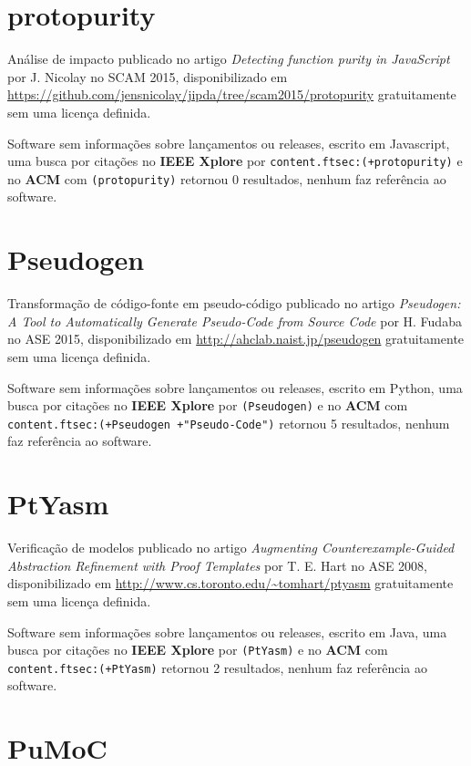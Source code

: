 \section{protopurity}

Análise de impacto
publicado no artigo {\it Detecting function purity in JavaScript}
por J. Nicolay
no SCAM 2015,
disponibilizado em \url{https://github.com/jensnicolay/jipda/tree/scam2015/protopurity}
gratuitamente
sem uma licença definida.

Software sem informações sobre lançamentos ou releases,
escrito em Javascript,
uma busca por citações no {\bf IEEE Xplore} por
\texttt{content.ftsec:(+protopurity)}
e no {\bf ACM} com
\texttt{(protopurity)}
retornou
0 resultados,
nenhum faz referência ao software.


\section{Pseudogen}

Transformação de código-fonte em pseudo-código
publicado no artigo {\it Pseudogen: A Tool to Automatically Generate Pseudo-Code from Source Code}
por H. Fudaba
no ASE 2015,
disponibilizado em \url{http://ahclab.naist.jp/pseudogen}
gratuitamente
sem uma licença definida.

Software sem informações sobre lançamentos ou releases,
escrito em Python,
uma busca por citações no {\bf IEEE Xplore} por
\texttt{(Pseudogen)}
e no {\bf ACM} com
\texttt{content.ftsec:(+Pseudogen +"Pseudo-Code")}
retornou
5 resultados,
nenhum faz referência ao software.


\section{PtYasm}

Verificação de modelos
publicado no artigo {\it Augmenting Counterexample-Guided Abstraction Refinement with Proof Templates}
por T. E. Hart
no ASE 2008,
disponibilizado em \url{http://www.cs.toronto.edu/~tomhart/ptyasm}
gratuitamente
sem uma licença definida.

Software sem informações sobre lançamentos ou releases,
escrito em Java,
uma busca por citações no {\bf IEEE Xplore} por
\texttt{(PtYasm)}
e no {\bf ACM} com
\texttt{content.ftsec:(+PtYasm)}
retornou
2 resultados,
nenhum faz referência ao software.


\section{PuMoC}

